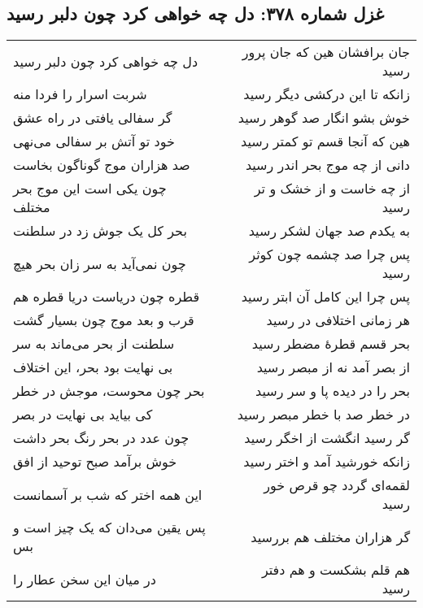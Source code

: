 \begin{center}
\section*{غزل شماره ۳۷۸: دل چه خواهی کرد چون دلبر رسید}
\label{sec:378}
\begin{longtable}{l p{0.5cm} r}
دل چه خواهی کرد چون دلبر رسید
&&
جان برافشان هین که جان پرور رسید
\\
شربت اسرار را فردا منه
&&
زانکه تا این درکشی دیگر رسید
\\
گر سفالی یافتی در راه عشق
&&
خوش بشو انگار صد گوهر رسید
\\
خود تو آتش بر سفالی می‌نهی
&&
هین که آنجا قسم تو کمتر رسید
\\
صد هزاران موج گوناگون بخاست
&&
دانی از چه موج بحر اندر رسید
\\
چون یکی است این موج بحر مختلف
&&
از چه خاست و از خشک و تر رسید
\\
بحر کل یک جوش زد در سلطنت
&&
به یکدم صد جهان لشکر رسید
\\
چون نمی‌آید به سر زان بحر هیچ
&&
پس چرا صد چشمه چون کوثر رسید
\\
قطره چون دریاست دریا قطره هم
&&
پس چرا این کامل آن ابتر رسید
\\
قرب و بعد موج چون بسیار گشت
&&
هر زمانی اختلافی در رسید
\\
سلطنت از بحر می‌ماند به سر
&&
بحر قسم قطرهٔ مضطر رسید
\\
بی نهایت بود بحر، این اختلاف
&&
از بصر آمد نه از مبصر رسید
\\
بحر چون محوست، موجش در خطر
&&
بحر را در دیده پا و سر رسید
\\
کی بیاید بی نهایت در بصر
&&
در خطر صد با خطر مبصر رسید
\\
چون عدد در بحر رنگ بحر داشت
&&
گر رسید انگشت از اخگر رسید
\\
خوش برآمد صبح توحید از افق
&&
زانکه خورشید آمد و اختر رسید
\\
این همه اختر که شب بر آسمانست
&&
لقمه‌ای گردد چو قرص خور رسید
\\
پس یقین می‌دان که یک چیز است و بس
&&
گر هزاران مختلف هم بررسید
\\
در میان این سخن عطار را
&&
هم قلم بشکست و هم دفتر رسید
\\
\end{longtable}
\end{center}
